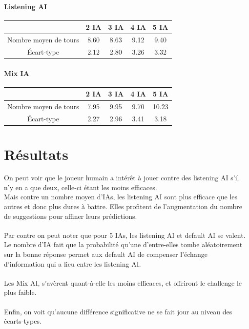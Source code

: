 \documentclass[a4paper,10pt]{article}
\begin{document}
		\paragraph*{Listening AI}\begin{center}
			\begin{tabular}{|c|c|c|c|c|} \hline
		  									 &	 	 2 IA 		 &  3 IA 	 	 &   4 IA 	 	&   5 IA 	\\ \hline
				Nombre moyen de tours		 & 	 	8.60		& 	8.63		& 	9.12	 	& 	9.40\\ \hline
				Écart-type					&		2.12	 	& 	2.80	 	& 	3.26	 	& 	3.32\\ \hline
			\end{tabular} \end{center}
		\paragraph*{Mix IA}\begin{center}
			\begin{tabular}{|c|c|c|c|c|} \hline
		  									 &	 	 2 IA 		 &  3 IA 	 	 &   4 IA 	 	&   5 IA 	\\ \hline
				Nombre moyen de tours		 & 	 	7.95		& 	9.95		& 	9.70	 	& 	10.23\\ \hline
				Écart-type					&		2.27	 	& 	2.96	 	& 	3.41	 	& 	3.18\\ \hline
			\end{tabular} \end{center}
		



\section{Résultats}

 	On peut voir que le joueur humain a intérêt à jouer contre des listening AI s'il n'y en a que deux, celle-ci étant les moins efficaces.\\
 	Mais contre un nombre moyen d'IAs, les listening AI sont plus efficace que les autres et donc plus dures à battre.
 	Elles profitent de l'augmentation du nombre de suggestions pour affiner leurs prédictions.\\
 	~\\
 	Par contre on peut noter que pour 5 IAs, les listening AI et default AI se valent. Le nombre d'IA fait que la probabilité qu'une d'entre-elles tombe aléatoirement sur la bonne réponse permet aux default AI de compenser l'échange d'information qui a lieu entre les listening AI.\\
 	~\\
 	Les Mix AI, s'avèrent quant-à-elle les moins efficaces, et offriront le challenge le plus faible.\\
 	~\\
 	Enfin, on voit qu'aucune différence significative ne se fait jour au niveau des écarts-types.
 	
\end{document}
